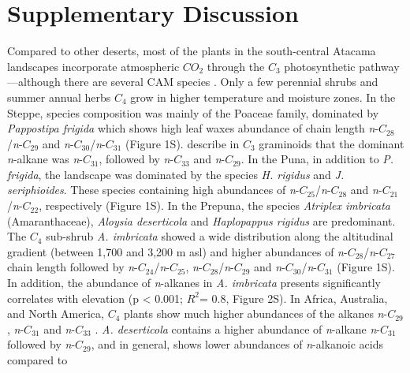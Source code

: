 \documentclass[
  authoryear,
  preprint,
  3p]{elsarticle}
\begin{document}
\hypertarget{supplementary-discussion}{%
\section{Supplementary Discussion}\label{supplementary-discussion}}

Compared to other deserts, most of the plants in the south-central
Atacama landscapes incorporate atmospheric \(CO_{2}\) through the
\(C_{3}\) photosynthetic pathway ---although there are several CAM
species \citep{ehleringerCarbonIsotopeRatios1998}. Only a few perennial
shrubs and summer annual herbs \(C_{4}\) grow in higher temperature and
moisture zones. In the Steppe, species composition was mainly of the
Poaceae family, dominated by \emph{Pappostipa frigida} which shows high
leaf waxes abundance of chain length
\emph{n}-\(C_{28}\)/\emph{n}-\(C_{29}\) and
\emph{n}-\(C_{30}\)/\emph{n}-\(C_{31}\) (Figure 1S).
\citet{diefendorfExtractingMostTerrestrial2017} describe in \(C_{3}\)
graminoids that the dominant \emph{n}-alkane was \emph{n}-\(C_{31}\),
followed by \emph{n}-\(C_{33}\) and \emph{n}-\(C_{29}\). In the Puna, in
addition to \emph{P. frigida}, the landscape was dominated by the
species \emph{H. rigidus} and \emph{J. seriphioides}. These species
containing high abundances of \emph{n}-\(C_{25}\)/\emph{n}-\(C_{28}\)
and \emph{n}-\(C_{21}\)/\emph{n}-\(C_{22}\), respectively (Figure 1S).
In the Prepuna, the species \emph{Atriplex imbricata} (Amaranthaceae),
\emph{Aloysia deserticola} and \emph{Haplopappus rigidus} are
predominant. The \(C_{4}\) sub-shrub \emph{A. imbricata} showed a wide
distribution along the altitudinal gradient (between 1,700 and 3,200 m
asl) and higher abundances of \emph{n}-\(C_{28}\)/\emph{n}-\(C_{27}\)
chain length followed by \emph{n}-\(C_{24}\)/\emph{n}-\(C_{25}\),
\emph{n}-\(C_{28}\)/\emph{n}-\(C_{29}\) and
\emph{n}-\(C_{30}\)/\emph{n}-\(C_{31}\) (Figure 1S). In addition, the
abundance of \emph{n}-alkanes in \emph{A. imbricata} presents
significantly correlates with elevation (p \textless{} 0.001; \(R^{2}\)=
0.8, Figure 2S). In Africa, Australia, and North America, \(C_{4}\)
plants show much higher abundances of the alkanes \emph{n}-\(C_{29}\),
\emph{n}-\(C_{31}\) and \emph{n}-\(C_{33}\)
\citep{carrLeafWaxNalkane2014, feakinsProductionLeafWax2016, garcinReconstructingC3C42014, howardModellingLeafWax2018, vogtsDistributionPatternsStable2009}.
\emph{A. deserticola} contains a higher abundance of \emph{n}-alkane
\emph{n}-\(C_{31}\) followed by \emph{n}-\(C_{29}\), and in general,
shows lower abundances of \emph{n}-alkanoic acids compared to
\end{document}
